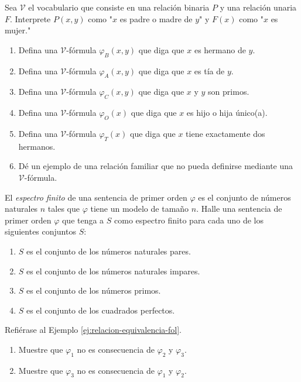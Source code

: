 \message{ !name(main.tex)}\documentclass[12pt,a4paper]{book}
\newcommand{\comillas}[1]{"#1"}
\newcommand{\VV}{\mathcal{V}}
\begin{document}
    \begin{ejercicio}
        Sea $\VV$ el vocabulario que consiste en una relación binaria $P$ y una relación unaria $F$. Interprete $P(x,y)$
        como \comillas{$x$ es padre o madre de $y$} y $F(x)$ como \comillas{$x$ es mujer.}
        \begin{enumerate}[label=(\alph*)]
            \item Defina una $\VV$-fórmula $\varphi_{B}(x,y)$ que diga que $x$ es hermano de $y$.
            \item Defina una $\VV$-fórmula $\varphi_{A}(x,y)$ que diga que $x$ es tía de $y$.
            \item Defina una $\VV$-fórmula $\varphi_{C}(x,y)$ que diga que $x$ y $y$ son primos.
            \item Defina una $\VV$-fórmula $\varphi_{O}(x)$ que diga que $x$ es hijo o hija único(a).
            \item Defina una $\VV$-fórmula $\varphi_{T}(x)$ que diga que $x$ tiene exactamente dos hermanos.
            \item Dé un ejemplo de una relación familiar que no pueda definirse mediante una $\VV$-fórmula.
        \end{enumerate}
    \end{ejercicio}

    \begin{ejercicio}
        El \textit{espectro finito} de una sentencia de primer orden $\varphi$ es el conjunto de números naturales $n$
        tales que $\varphi$ tiene un modelo de tamaño $n$. Halle una sentencia de primer orden $\varphi$ que tenga a $S$
        como espectro finito para cada uno de los siguientes conjuntos $S$:
        \begin{enumerate}[label=(\alph*)]
            \item $S$ es el conjunto de los números naturales pares.
            \item $S$ es el conjunto de los números naturales impares.
            \item $S$ es el conjunto de los números primos.
            \item $S$ es el conjunto de los cuadrados perfectos.
        \end{enumerate}
    \end{ejercicio}

    \begin{ejercicio}
        Refiérase al Ejemplo \ref{ej:relacion-equivalencia-fol}.
        \begin{enumerate}[label=(\alph*)]
            \item Muestre que $\varphi_{1}$ no es consecuencia de $\varphi_{2}$ y $\varphi_{3}$.
            \item Muestre que $\varphi_{3}$ no es consecuencia de $\varphi_{1}$ y $\varphi_{2}$.
        \end{enumerate}
    \end{ejercicio}
\end{document}
